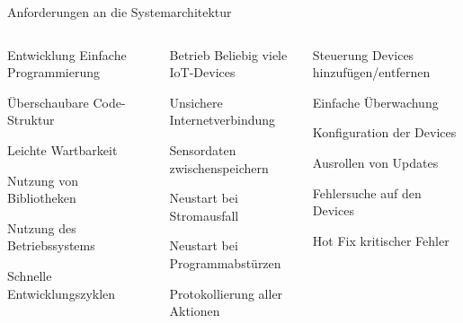 {
\scriptsize

\begin{frame}{Anforderungen an die Systemarchitektur}

    \begin{columns}[T]
        \begin{block}{Entwicklung}
            \smallskip
            Einfache Programmierung

            \smallskip
            Überschaubare Code-Struktur

            \smallskip
            Leichte Wartbarkeit

            \smallskip
            Nutzung von Bibliotheken

            \smallskip
            Nutzung des Betriebssystems

            \smallskip
            Schnelle Entwicklungszyklen
        \end{block}

        \begin{block}{Betrieb}
            \smallskip
            Beliebig viele IoT-Devices

            \smallskip
            Unsichere Internetverbindung

            \smallskip
            Sensordaten zwischenspeichern

            \smallskip
            Neustart bei Stromausfall

            \smallskip
            Neustart bei Programmabstürzen

            \smallskip
            Protokollierung aller Aktionen
        \end{block}

        \begin{block}{Steuerung}
            \smallskip
            Devices hinzufügen/entfernen

            \smallskip
            Einfache Überwachung

            \smallskip
            Konfiguration der Devices

            \smallskip
            Ausrollen von Updates

            \smallskip
            Fehlersuche auf den Devices

            \smallskip
            Hot Fix kritischer Fehler
        \end{block}
    \end{columns}


\end{frame}}
